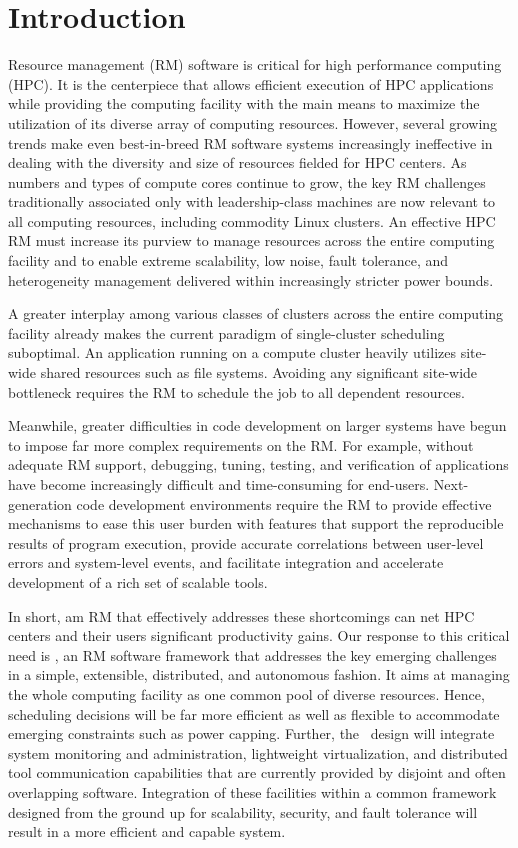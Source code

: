 \section{Introduction}

Resource management (RM) software is critical
for high performance computing (HPC).
It is the centerpiece that allows efficient
execution of HPC applications while providing
the computing facility with the main means
to maximize the utilization of its diverse array of computing
resources.
However, several growing trends make even
best-in-breed RM software systems increasingly ineffective
in dealing with the diversity and size of resources fielded for HPC centers.
As numbers and types of compute cores
continue to grow, the key RM challenges traditionally associated only
with leadership-class machines are now
relevant to all computing resources, including
commodity Linux clusters. An effective HPC RM must increase
its purview to manage resources across the entire
computing facility and to enable extreme scalability,
low noise, fault tolerance,
and heterogeneity management delivered within increasingly
stricter power bounds.

A greater interplay among various classes
of clusters across the entire computing facility already 
makes the current paradigm of single-cluster scheduling
suboptimal. An application running on a compute
cluster heavily utilizes site-wide shared resources
such as file systems.
Avoiding any significant site-wide bottleneck
requires the RM to schedule the job to all dependent
resources.

Meanwhile, greater difficulties in code development
on larger systems have begun to impose far more complex
requirements on the RM. For example, without adequate
RM support, debugging, tuning, testing, and verification
of applications have become increasingly difficult
and time-consuming for end-users.
Next-generation code development environments
require the RM to provide effective mechanisms
to ease this user burden with features that support the reproducible results of program execution,
provide accurate correlations between user-level errors
and system-level events,
and facilitate integration and accelerate development of a rich set of scalable tools.

In short, am RM that effectively
addresses these shortcomings can net HPC centers
and their users significant productivity gains.
Our response to this critical need is \flux,
an RM software framework that addresses the key emerging
challenges in a simple, extensible, distributed,
and autonomous fashion.
It aims at managing the whole computing facility
as one common pool of diverse resources.
Hence, scheduling decisions will be far more efficient
as well as flexible to accommodate emerging constraints
such as power capping.
Further, the \flux\ design will integrate system monitoring and
administration, lightweight virtualization, 
and distributed tool communication capabilities 
that are currently provided by disjoint
and often overlapping software. 
Integration of these facilities within a common framework
designed from the ground up for scalability, security,
and fault tolerance will result in a more efficient
and capable system.

